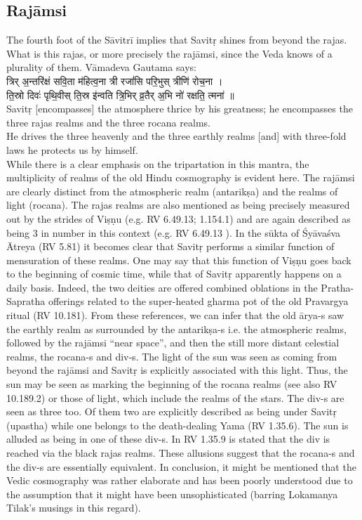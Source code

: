 \documentclass[12pt]{article}
\begin{document}
\subsection{Rajāmsi}
The fourth foot of the Sāvitrī implies that Savitṛ shines from beyond the rajas. What is this rajas, or more precisely the rajāmsi, since the Veda knows of a plurality of them. Vāmadeva Gautama says:\\[8pt]
{\skt त्रिर् अ॒न्तरि॑क्षं सवि॒ता म॑हित्व॒ना त्री रजां॑सि परि॒भुस् त्रीणि॑ रोच॒ना ।\\
ति॒स्रो दिवः॑ पृथि॒वीस् ति॒स्र इ॑न्वति त्रि॒भिर् व्र॒तैर् अ॒भि नो॑ रक्षति॒ त्मना॑ ॥
}\\[8pt]
Savitṛ [encompasses] the atmosphere thrice by his greatness; he encompasses the three rajas realms and the three rocana realms.\\
He drives the three heavenly and the three earthly realms [and] with three-fold laws he protects us by himself.\\[8pt]
While there is a clear emphasis on the tripartation in this mantra, the multiplicity of realms of the old Hindu cosmography is evident here. The rajāmsi are clearly distinct from the atmospheric realm (antarikṣa) and the realms of light (rocana). The rajas realms are also mentioned as being precisely measured out by the strides of Viṣṇu (e.g. RV 6.49.13; 1.154.1) and are again described as being 3 in number in this context (e.g. RV 6.49.13 ). In the sūkta of Śyāvaśva Ātreya (RV 5.81) it becomes clear that Savitṛ performs a similar function of mensuration of these realms. One may say that this function of Viṣṇu goes back to the beginning of cosmic time, while that of Savitṛ apparently happens on a daily basis. Indeed, the two deities are offered combined oblations in the Pratha-Sapratha offerings related to the super-heated gharma pot of the old Pravargya ritual (RV 10.181).  From these references, we can infer that the old ārya-s saw the earthly realm as surrounded by the antarikṣa-s i.e. the atmospheric realms, followed by the  rajāmsi ``near space'', and then the still more distant celestial realms, the rocana-s and div-s. The light of the sun was seen as coming from beyond the rajāmsi and Savitṛ is explicitly associated with this light. Thus, the sun may be seen as marking the beginning of the rocana realms (see also RV 10.189.2) or those of light, which include the realms of the stars. The div-s are seen as three too. Of them two are explicitly described as being under Savitṛ (upastha) while one belongs to the death-dealing Yama (RV 1.35.6). The sun is alluded as being in one of these div-s.  In RV 1.35.9 is stated that the div is reached via the black rajas realms. These allusions suggest that the rocana-s and the div-s are essentially equivalent. In conclusion, it might be mentioned that the Vedic cosmography was rather elaborate and has been poorly understood due to the assumption that it might have been unsophisticated (barring Lokamanya Tilak's musings in this regard).
\end{document}
